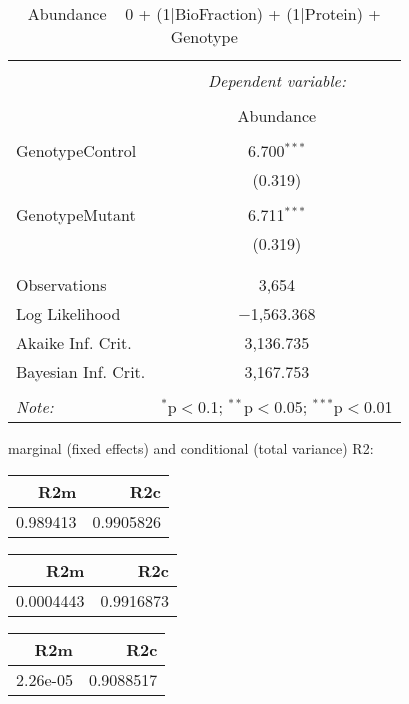 \documentclass[11pt]{report}
\begin{document}
\begin{table}[!htbp] \centering 
  \caption{Abundance ~ 0 + (1|BioFraction) + (1|Protein) + Genotype} 
  \label{} 
\begin{tabular}{@{\extracolsep{5pt}}lc} 
\\[-1.8ex]\hline 
\hline \\[-1.8ex] 
 & \multicolumn{1}{c}{\textit{Dependent variable:}} \\ 
\cline{2-2} 
\\[-1.8ex] & Abundance \\ 
\hline \\[-1.8ex] 
 GenotypeControl & 6.700$^{***}$ \\ 
  & (0.319) \\ 
  & \\ 
 GenotypeMutant & 6.711$^{***}$ \\ 
  & (0.319) \\ 
  & \\ 
\hline \\[-1.8ex] 
Observations & 3,654 \\ 
Log Likelihood & $-$1,563.368 \\ 
Akaike Inf. Crit. & 3,136.735 \\ 
Bayesian Inf. Crit. & 3,167.753 \\ 
\hline 
\hline \\[-1.8ex] 
\textit{Note:}  & \multicolumn{1}{r}{$^{*}$p$<$0.1; $^{**}$p$<$0.05; $^{***}$p$<$0.01} \\ 
\end{tabular} 
\end{table} 
marginal (fixed effects) and conditional (total variance) R2:

\begin{tabular}{r|r}
\hline
R2m & R2c\\
\hline
0.989413 & 0.9905826\\
\hline
\end{tabular}

\begin{tabular}{r|r}
\hline
R2m & R2c\\
\hline
0.0004443 & 0.9916873\\
\hline
\end{tabular}

\begin{tabular}{r|r}
\hline
R2m & R2c\\
\hline
2.26e-05 & 0.9088517\\
\hline
\end{tabular}
\end{document}
